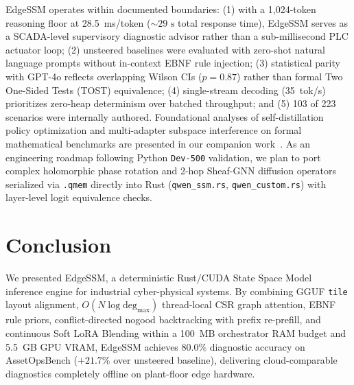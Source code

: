 \documentclass[journal]{IEEEtran}
\begin{document}
EdgeSSM operates within documented boundaries: (1) with a 1,024-token reasoning floor at 28.5~ms/token ($\sim 29\text{ s}$ total response time), EdgeSSM serves as a SCADA-level supervisory diagnostic advisor rather than a sub-millisecond PLC actuator loop; (2) unsteered baselines were evaluated with zero-shot natural language prompts without in-context EBNF rule injection; (3) statistical parity with GPT-4o reflects overlapping Wilson CIs ($p=0.87$) rather than formal Two One-Sided Tests (TOST) equivalence; (4) single-stream decoding (35~tok/s) prioritizes zero-heap determinism over batched throughput; and (5) 103 of 223 scenarios were internally authored. Foundational analyses of self-distillation policy optimization and multi-adapter subspace interference on formal mathematical benchmarks are presented in our companion work~\cite{ozturk2026sodals}. As an engineering roadmap following Python \texttt{Dev-500} validation, we plan to port complex holomorphic phase rotation and 2-hop Sheaf-GNN diffusion operators serialized via \texttt{.qmem} directly into Rust (\texttt{qwen\_ssm.rs}, \texttt{qwen\_custom.rs}) with layer-level logit equivalence checks.

\section{Conclusion}

We presented EdgeSSM, a deterministic Rust/CUDA State Space Model inference engine for industrial cyber-physical systems. By combining GGUF \texttt{tile} layout alignment, $O(N \log \text{deg}_{\max})$ thread-local CSR graph attention, EBNF rule priors, conflict-directed nogood backtracking with prefix re-prefill, and continuous Soft LoRA Blending within a 100~MB orchestrator RAM budget and 5.5~GB GPU VRAM, EdgeSSM achieves 80.0\% diagnostic accuracy on AssetOpsBench ($+21.7\%$ over unsteered baseline), delivering cloud-comparable diagnostics completely offline on plant-floor edge hardware.
\end{document}
